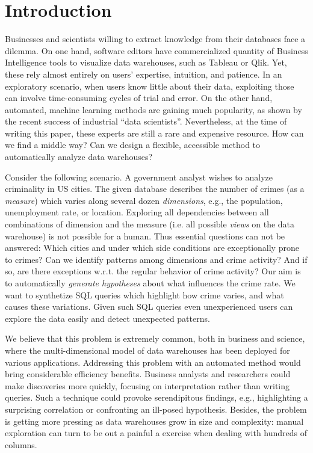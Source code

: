 \section{Introduction}
\label{sec:intro}

Businesses and scientists willing to extract knowledge from their databases
face a dilemma. On one hand, software editors have commercialized quantity of
Business Intelligence tools to visualize data warehouses, such as Tableau or
Qlik. Yet, these rely almost entirely on users' expertise, intuition, and
patience. In an exploratory scenario, when users know little about their data,
exploiting those can involve time-consuming cycles of trial and error. On the
other hand, automated, machine learning methods are gaining much
popularity, as shown by the recent success of industrial ``data
scientists''. Nevertheless, at the time of writing this paper, these experts
are still a rare and expensive resource. How can we find a middle way? Can we
design a flexible, accessible method to automatically analyze data warehouses?

Consider the following scenario. A government analyst wishes to analyze
criminality in US cities. The given database describes the
number of crimes (as a \emph{measure}) which varies along several dozen \emph{dimensions}, e.g., the
population, unemployment rate, or location. Exploring all dependencies between all combinations of dimension and the measure (i.e. all possible \emph{views} on the data warehouse) is not possible for a human. Thus essential questions can not be answered: Which cities and under which side conditions are exceptionally prone to crimes? Can we identify patterns among dimensions and crime activity? And if so, are there exceptions w.r.t. the regular behavior of crime activity? Our aim is to automatically
\emph{generate hypotheses} about what influences the crime rate. We want to
synthetize SQL queries which highlight how crime varies, and what causes these
variations. Given such SQL queries even unexperienced users can explore the data easily and detect unexpected patterns.

We believe that this problem is extremely common, both in business and science, where the multi-dimensional model of data warehouses has been deployed for various applications. Addressing this problem with an automated method would bring considerable efficiency
benefits. Business analysts and researchers could make discoveries more
quickly, focusing on interpretation rather than writing queries. Such a
technique could provoke serendipitous findings, e.g., highlighting a surprising
correlation or confronting an ill-posed hypothesis.  Besides, the problem is
getting more pressing as data warehouses grow in size and complexity: manual
exploration can turn to be out a painful a exercise when dealing with hundreds
of columns.

